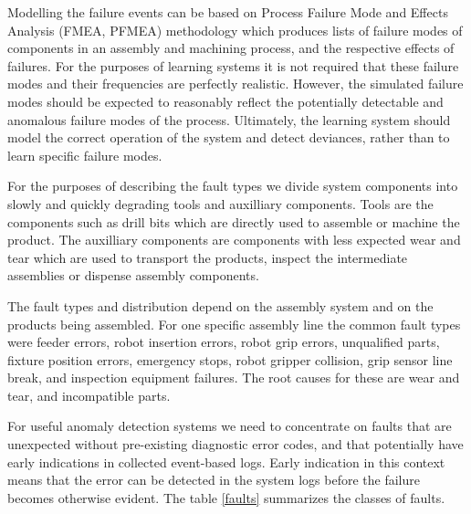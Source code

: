 \documentclass[journal]{IEEEtran}
\begin{document}
Modelling the failure events can be based on Process Failure Mode and Effects Analysis (FMEA, PFMEA) \cite{teng1996failure} methodology which produces lists of
failure modes of components
in an assembly and machining process, and the respective effects of failures. For the purposes of learning systems it is not required that these failure modes and their frequencies
are perfectly realistic. However, the simulated failure modes should be expected to reasonably reflect the potentially detectable and anomalous failure modes of the process.
Ultimately, the learning system should model the correct operation of the system and detect deviances, rather than to learn specific failure modes.

For the purposes of describing the fault types we divide system components into slowly and
quickly degrading tools and auxilliary components. Tools are the components such as drill bits which are directly used to assemble or
machine the product. The auxilliary components are components with less expected wear and tear which are used to transport the products,
inspect the intermediate assemblies or dispense assembly components.

The fault types and distribution depend on the assembly system
and on the products being assembled. For one
specific assembly line \cite{cong1997fault} the common fault types were feeder errors, robot insertion errors,
robot grip errors, unqualified parts, fixture position errors, emergency stops, robot gripper collision,
grip sensor line break, and inspection equipment failures. The root causes for these are wear and tear, and incompatible parts.

For useful anomaly detection systems we need to concentrate on faults that are unexpected without pre-existing diagnostic error codes, and that potentially have early indications
in collected event-based logs. Early indication in this context means that the error can be detected in the system logs before the failure becomes otherwise evident.
The table \ref{faults} summarizes the classes of faults.
\end{document}
